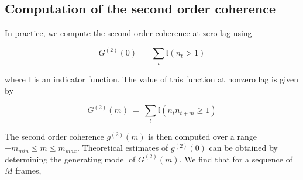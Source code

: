 



\subsection{Computation of the second order coherence}

In practice, we compute the second order coherence at zero lag using

\begin{equation*}
G^{(2)}(0)\ =\ \sum_{t}{\mathbb{I}(n_t>1)}
\end{equation*}

where $\mathbb{I}$ is an indicator function. The value of this function at nonzero lag is given by

\begin{equation*}
G^{(2)}(m)\ =\ \sum_{t}{\mathbb{I}(n_tn_{t+m}\geq1)}
\end{equation*}

The second order coherence $g^{(2)}(m)$ is then computed over a range $-m_{min}\le m\le m_{max}$. Theoretical estimates of $g^{(2)}(0)$ can be obtained by determining the generating model of $G^{(2)}(m)$. We find that for a sequence of $M$ frames,

